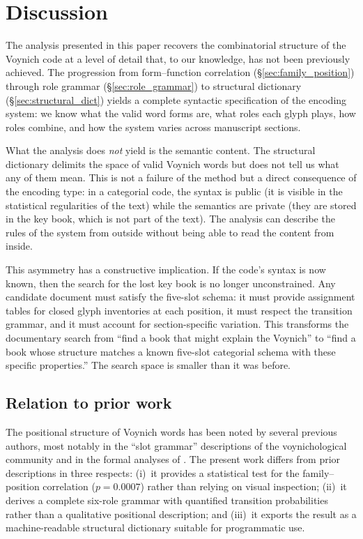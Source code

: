 

\section{Discussion}
\label{sec:discussion}

The analysis presented in this paper recovers the combinatorial
structure of the Voynich code at a level of detail that, to our
knowledge, has not been previously achieved. The progression from
form--function correlation (\S\ref{sec:family_position}) through
role grammar (\S\ref{sec:role_grammar}) to structural dictionary
(\S\ref{sec:structural_dict}) yields a complete syntactic
specification of the encoding system: we know what the valid word
forms are, what roles each glyph plays, how roles combine, and how
the system varies across manuscript sections.

What the analysis does \emph{not} yield is the semantic content.
The structural dictionary delimits the space of valid Voynich words
but does not tell us what any of them mean. This is not a failure of
the method but a direct consequence of the encoding type: in a
categorial code, the syntax is public (it is visible in the statistical
regularities of the text) while the semantics are private (they are
stored in the key book, which is not part of the text). The analysis
can describe the rules of the system from outside without being able
to read the content from inside.

This asymmetry has a constructive implication. If the code's syntax
is now known, then the search for the lost key book is no longer
unconstrained. Any candidate document must satisfy the five-slot
schema: it must provide assignment tables for closed glyph inventories
at each position, it must respect the transition grammar, and it must
account for section-specific variation. This transforms the documentary
search from ``find a book that might explain the Voynich'' to ``find
a book whose structure matches a known five-slot categorial schema
with these specific properties.'' The search space is smaller than it
was before.

\subsection{Relation to prior work}

The positional structure of Voynich words has been noted by several
previous authors, most notably in the ``slot grammar'' descriptions
of the voynichological community and in the formal analyses of
\citet{dimperio1978}. The present work differs from prior descriptions
in three respects: (i)~it provides a statistical test for the
family--position correlation ($p = 0.0007$) rather than relying on
visual inspection; (ii)~it derives a complete six-role grammar with
quantified transition probabilities rather than a qualitative
positional description; and (iii)~it exports the result as a
machine-readable structural dictionary suitable for programmatic
use.

